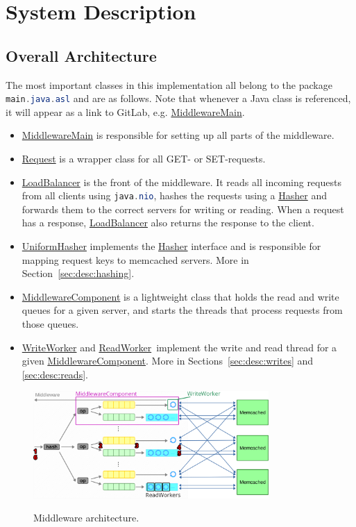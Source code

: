 \documentclass[11pt]{article}
\newcommand{\code}[1]{\lstinline[language=Java]{#1}}
\newcommand{\linkmain}[1]{\href{https://gitlab.inf.ethz.ch/pungast/asl-fall16-project/blob/master/src/main/java/asl/#1.java}{#1}}
\begin{document}
\section{System Description}\label{sec:system-description}

\subsection{Overall Architecture}\label{sec:desc:architecture}

The most important classes in this implementation all belong to the package \code{main.java.asl} and are as follows. Note that whenever a Java class is referenced, it will appear as a link to GitLab, e.g. \linkmain{MiddlewareMain}. 

\begin{itemize}
\item \linkmain{MiddlewareMain} is responsible for setting up all parts of the middleware.
\item \linkmain{Request} is a wrapper class for all GET- or SET-requests.
\item \linkmain{LoadBalancer} is the front of the middleware. It reads all incoming requests from all clients using \code{java.nio}, hashes the requests using a \linkmain{Hasher} and forwards them to the correct servers for writing or reading. When a request has a response, \linkmain{LoadBalancer} also returns the response to the client.
\item \linkmain{UniformHasher} implements the \linkmain{Hasher} interface and is responsible for mapping request keys to memcached servers. More in Section~\ref{sec:desc:hashing}.
\item \linkmain{MiddlewareComponent} is a lightweight class that holds the read and write queues for a given server, and starts the threads that process requests from those queues.
\item \linkmain{WriteWorker} and \linkmain{ReadWorker} implement the write and read thread for a given \linkmain{MiddlewareComponent}. More in Sections~\ref{sec:desc:writes} and \ref{sec:desc:reads}.
\end{itemize}

\begin{figure}[h]
\caption{Middleware architecture.}
\centering
\includegraphics[width=0.8\textwidth]{figures/structure.png}
\label{fig:structure}
\end{figure}
\end{document}
